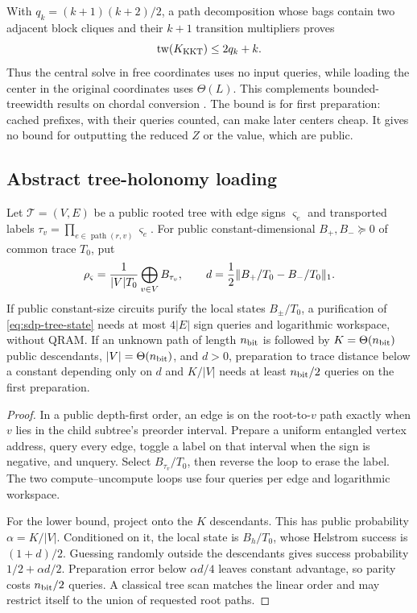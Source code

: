 With $q_k=(k+1)(k+2)/2$, a path decomposition whose bags contain two adjacent
block cliques and their $k+1$ transition multipliers proves
\begin{equation}
 \operatorname{tw}(K_{\rm KKT})\leq2q_k+k.                 \label{eq:sdp-schur-treewidth}
\end{equation}
Thus the central solve in free coordinates uses no input queries, while
loading the center in the original coordinates uses $\Theta(L)$.
This complements bounded-treewidth results on chordal conversion
\cite{zhang2024-complexity-of-chordal-conversion-for}.  The bound is
for first preparation: cached prefixes, with their queries counted, can make
later centers cheap.  It gives no bound for outputting the reduced $Z$ or
the value, which are public.

\subsection{Abstract tree-holonomy loading}
\label{sec:sdp-tree-loading}

\begin{theorem}
\label{thm:sdp-tree-loading}
Let $\mathcal T=(V,E)$ be a public rooted tree with edge signs
$\varsigma_e$ and transported labels
$\tau_v=\prod_{e\in\operatorname{path}(r,v)}\varsigma_e$.  For public
constant-dimensional $B_+,B_-\succeq0$ of common trace $T_0$, put
\begin{equation}
 \rho_\varsigma=\frac1{|V|T_0}\bigoplus_{v\in V}B_{\tau_v},
 \qquad d=\frac12\lVert B_+/T_0-B_-/T_0\rVert_1.                 \label{eq:sdp-tree-state}
\end{equation}
If public constant-size circuits purify the local states $B_\pm/T_0$, a
purification of \eqref{eq:sdp-tree-state} needs at most $4|E|$ sign queries and logarithmic
workspace, without QRAM.  If an unknown path of length $n_{\rm bit}$ is
followed by $K=\Theta(n_{\rm bit})$ public descendants, $|V|=\Theta(n_{\rm bit})$,
and $d>0$, preparation to trace distance below a constant depending only on
$d$ and $K/|V|$ needs at least $n_{\rm bit}/2$ queries on the first
preparation.
\end{theorem}

\begin{proof}
In a public depth-first order, an edge is on the root-to-$v$ path exactly when
$v$ lies in the child subtree's preorder interval.  Prepare a uniform
entangled vertex address, query every edge, toggle a label on that interval
when the sign is negative, and unquery.  Select $B_{\tau_v}/T_0$, then reverse
the loop to erase the label.  The two compute--uncompute loops use four
queries per edge and logarithmic workspace.

For the lower bound, project onto the $K$ descendants.  This has public
probability $\alpha=K/|V|$.  Conditioned on it, the local state is $B_h/T_0$,
whose Helstrom success is $(1+d)/2$.  Guessing randomly outside the descendants gives success probability $1/2+\alpha d/2$.  Preparation error below $\alpha d/4$ leaves constant
advantage, so parity costs $n_{\rm bit}/2$ queries.  A classical tree scan
matches the linear order and may restrict itself to the union of requested
root paths.
\end{proof}

